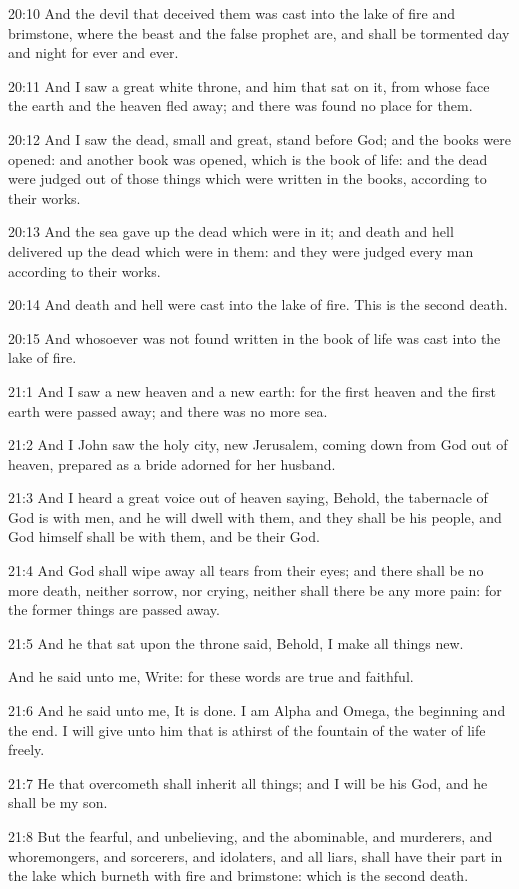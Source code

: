 20:10 And the devil that deceived them was cast into the lake of fire and brimstone, where the beast and the false prophet are, and shall be tormented day and night for ever and ever.

20:11 And I saw a great white throne, and him that sat on it, from whose face the earth and the heaven fled away; and there was found no place for them.

20:12 And I saw the dead, small and great, stand before God; and the books were opened: and another book was opened, which is the book of life: and the dead were judged out of those things which were written in the books, according to their works.

20:13 And the sea gave up the dead which were in it; and death and hell delivered up the dead which were in them: and they were judged every man according to their works.

20:14 And death and hell were cast into the lake of fire. This is the second death.

20:15 And whosoever was not found written in the book of life was cast into the lake of fire.

21:1 And I saw a new heaven and a new earth: for the first heaven and the first earth were passed away; and there was no more sea.

21:2 And I John saw the holy city, new Jerusalem, coming down from God out of heaven, prepared as a bride adorned for her husband.

21:3 And I heard a great voice out of heaven saying, Behold, the tabernacle of God is with men, and he will dwell with them, and they shall be his people, and God himself shall be with them, and be their God.

21:4 And God shall wipe away all tears from their eyes; and there shall be no more death, neither sorrow, nor crying, neither shall there be any more pain: for the former things are passed away.

21:5 And he that sat upon the throne said, Behold, I make all things new.

And he said unto me, Write: for these words are true and faithful.

21:6 And he said unto me, It is done. I am Alpha and Omega, the beginning and the end. I will give unto him that is athirst of the fountain of the water of life freely.

21:7 He that overcometh shall inherit all things; and I will be his God, and he shall be my son.

21:8 But the fearful, and unbelieving, and the abominable, and murderers, and whoremongers, and sorcerers, and idolaters, and all liars, shall have their part in the lake which burneth with fire and brimstone: which is the second death.

